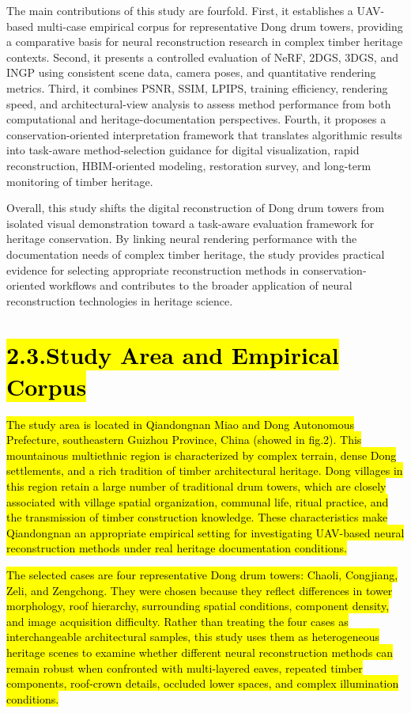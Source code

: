 The main contributions of this study are fourfold. First, it establishes
a UAV-based multi-case empirical corpus for representative Dong drum
towers, providing a comparative basis for neural reconstruction research
in complex timber heritage contexts. Second, it presents a controlled
evaluation of NeRF, 2DGS, 3DGS, and INGP using consistent scene data,
camera poses, and quantitative rendering metrics. Third, it combines
PSNR, SSIM, LPIPS, training efficiency, rendering speed, and
architectural-view analysis to assess method performance from both
computational and heritage-documentation perspectives. Fourth, it
proposes a conservation-oriented interpretation framework that
translates algorithmic results into task-aware method-selection guidance
for digital visualization, rapid reconstruction, HBIM-oriented modeling,
restoration survey, and long-term monitoring of timber heritage.

Overall, this study shifts the digital reconstruction of Dong drum
towers from isolated visual demonstration toward a task-aware evaluation
framework for heritage conservation. By linking neural rendering
performance with the documentation needs of complex timber heritage, the
study provides practical evidence for selecting appropriate
reconstruction methods in conservation-oriented workflows and
contributes to the broader application of neural reconstruction
technologies in heritage science.

\section{\texorpdfstring{\hl{2.3.Study Area and Empirical
Corpus}}{2.3.Study Area and Empirical Corpus}}\label{study-area-and-empirical-corpus}

\hl{The study area is located in Qiandongnan Miao and Dong Autonomous
Prefecture, southeastern Guizhou Province, China (showed in fig.2). This
mountainous multiethnic region is characterized by complex terrain,
dense Dong settlements, and a rich tradition of timber architectural
heritage. Dong villages in this region retain a large number of
traditional drum towers, which are closely associated with village
spatial organization, communal life, ritual practice, and the
transmission of timber construction knowledge. These characteristics
make Qiandongnan an appropriate empirical setting for investigating
UAV-based neural reconstruction methods under real heritage
documentation conditions.}

\hl{The selected cases are four representative Dong drum towers: Chaoli,
Congjiang, Zeli, and Zengchong. They were chosen because they reflect
differences in tower morphology, roof hierarchy, surrounding spatial
conditions, component density, and image acquisition difficulty. Rather
than treating the four cases as interchangeable architectural samples,
this study uses them as heterogeneous heritage scenes to examine whether
different neural reconstruction methods can remain robust when
confronted with multi-layered eaves, repeated timber components,
roof-crown details, occluded lower spaces, and complex illumination
conditions.}

